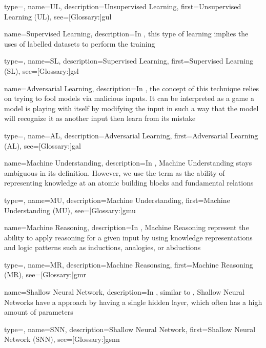 {
  type=\acronymtype,
  name={UL},
  description={Unsupervised Learning},
  first={Unsupervised Learning (UL)},
  see=[Glossary:]{gul}
}

{
  name={Supervised Learning},
  description={In , this type of learning implies the uses of labelled datasets to perform the training}
}

{
  type=\acronymtype,
  name={SL},
  description={Supervised Learning},
  first={Supervised Learning (SL)},
  see=[Glossary:]{gsl}
}

{
  name={Adversarial Learning},
  description={In , the concept of this technique relies on trying to fool models via malicious inputs. It can be interpreted as a game  a model is playing with itself by modifying the input in such a way that the model will recognize it as another input then learn from its mistake}
}

{
  type=\acronymtype,
  name={AL},
  description={Adversarial Learning},
  first={Adversarial Learning (AL)},
  see=[Glossary:]{gal}
}

{
  name={Machine Understanding},
  description={In , Machine Understanding stays ambiguous in its definition. However, we use the term as the ability of representing knowledge at an atomic building blocks and fundamental relations}
}

{
  type=\acronymtype,
  name={MU},
  description={Machine Understanding},
  first={Machine Understanding (MU)},
  see=[Glossary:]{gmu}
}

{
  name={Machine Reasoning},
  description={In , Machine Reasoning represent the ability to apply reasoning for a given input by using knowledge representations and logic patterns such as inductions, analogies, or abductions}
}

{
  type=\acronymtype,
  name={MR},
  description={Machine Reasonsing},
  first={Machine Reasoning (MR)},
  see=[Glossary:]{gmr}
}


{
  name={Shallow Neural Network},
  description={In , similar to , Shallow Neural Networks have a  approach by having a single hidden layer, which often has a high amount of parameters}
}

{
  type=\acronymtype,
  name={SNN},
  description={Shallow Neural Network},
  first={Shallow Neural Network (SNN)},
  see=[Glossary:]{gsnn}
}


